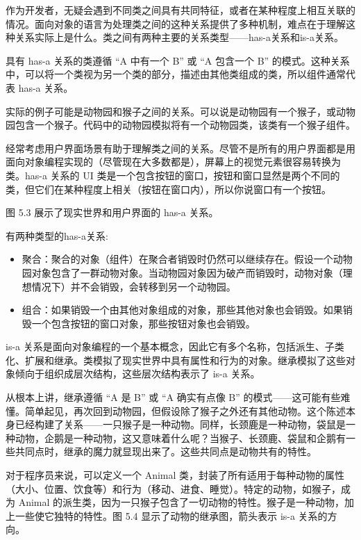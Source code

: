 
作为开发者，无疑会遇到不同类之间具有共同特征，或者在某种程度上相互关联的情况。面向对象的语言为处理类之间的这种关系提供了多种机制，难点在于理解这种关系实际上是什么。类之间有两种主要的关系类型——has-a关系和is-a关系。


具有 has-a 关系的类遵循 “A 中有一个 B” 或 “A 包含一个 B” 的模式。这种关系中，可以将一个类视为另一个类的部分，描述由其他类组成的类，所以组件通常代表 has-a 关系。

实际的例子可能是动物园和猴子之间的关系。可以说是动物园有一个猴子，或动物园包含一个猴子。代码中的动物园模拟将有一个动物园类，该类有一个猴子组件。

经常考虑用户界面场景有助于理解类之间的关系。尽管不是所有的用户界面都是用面向对象编程实现的（尽管现在大多数都是），屏幕上的视觉元素很容易转换为类。has-a 关系的 UI 类是一个包含按钮的窗口，按钮和窗口显然是两个不同的类，但它们在某种程度上相关（按钮在窗口内），所以你说窗口有一个按钮。

图 5.3 展示了现实世界和用户界面的 has-a 关系。


有两种类型的has-a关系:

\begin{itemize}
\item
聚合：聚合的对象（组件）在聚合者销毁时仍然可以继续存在。假设一个动物园对象包含了一群动物对象。当动物园对象因为破产而销毁时，动物对象（理想情况下）并不会销毁，会转移到另一个动物园。

\item
组合：如果销毁一个由其他对象组成的对象，那些其他对象也会销毁。如果销毁一个包含按钮的窗口对象，那些按钮对象也会销毁。
\end{itemize}


is-a 关系是面向对象编程的一个基本概念，因此它有多个名称，包括派生、子类化、扩展和继承。类模拟了现实世界中具有属性和行为的对象。继承模拟了这些对象倾向于组织成层次结构，这些层次结构表示了 is-a 关系。

从根本上讲，继承遵循 “A 是 B” 或 “A 确实有点像 B” 的模式——这可能有些难懂。简单起见，再次回到动物园，但假设除了猴子之外还有其他动物。这个陈述本身已经构建了关系——一只猴子是一种动物。同样，长颈鹿是一种动物，袋鼠是一种动物，企鹅是一种动物，这又意味着什么呢？当猴子、长颈鹿、袋鼠和企鹅有一些共同点时，继承的魔力就显现出来了。这些共同点是动物共有的特性。

对于程序员来说，可以定义一个 Animal 类，封装了所有适用于每种动物的属性（大小、位置、饮食等）和行为（移动、进食、睡觉）。特定的动物，如猴子，成为 Animal 的派生类，因为一只猴子包含了一切动物的特性。猴子是一种动物，加上一些使它独特的特性。图 5.4 显示了动物的继承图，箭头表示 is-a 关系的方向。

